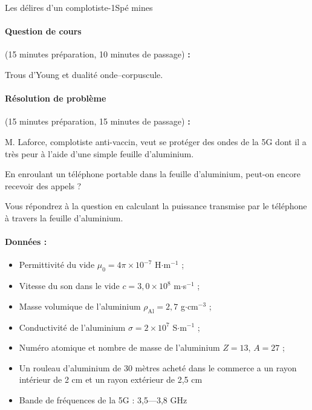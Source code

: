 \begin{exercise}{Les délires d'un complotiste}{-1}{Spé}
{}{mines}

\paragraph{Question de cours} \textsf{(15 minutes préparation, 10 minutes de passage) \textbf{:}}

Trous d'Young et dualité onde--corpuscule.

\paragraph{Résolution de problème} \textsf{(15 minutes préparation, 15 minutes de passage) \textbf{:}}

M. Laforce, complotiste anti-vaccin, veut se protéger des ondes de la 5G dont il a très peur à l'aide d'une simple feuille d'aluminium.

En enroulant un téléphone portable dans la feuille d'aluminium, peut-on encore recevoir des appels ?

Vous répondrez à la question en calculant la puissance transmise par le téléphone à travers la feuille d'aluminium.

\paragraph{Données :}
\begin{itemize}
    \item Permittivité du vide $\mu_0 = 4\pi\times 10^{-7}$ H$\cdot$m$^{-1}$ ;
    \item Vitesse du son dans le vide $c = 3,0 \times 10^8$ m$\cdot$s$^{-1}$ ;
    \item Masse volumique de l'aluminium $\rho_\text{Al} = 2,7$ g$\cdot$cm$^{-3}$ ;
    \item Conductivité de l'aluminium $\sigma = 2\times 10^7$ S$\cdot$m$^{-1}$ ;
    \item Numéro atomique et nombre de masse de l'aluminium $Z = 13$, $A = 27$ ;
    \item Un rouleau d'aluminium de 30 mètres acheté dans le commerce a un rayon intérieur de 2 cm et un rayon extérieur de 2,5 cm
    \item Bande de fréquences de la 5G : 3,5---3,8 GHz 
\end{itemize}

\end{exercise}
